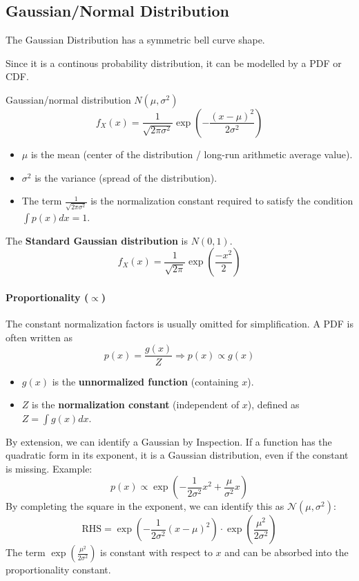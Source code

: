 \documentclass[../Probability.tex]{subfiles}
\begin{document}
\subsection{Gaussian/Normal Distribution}
The Gaussian Distribution has a symmetric bell curve shape.

\noindent Since it is a continous probability distribution, it can be modelled by a PDF or CDF.

\noindent Gaussian/normal distribution $N(\mu,\sigma^2)$
\[ f_X(x) = \frac{1}{\sqrt{2\pi\sigma^2}} \exp(-\frac{(x-\mu)^2}{2\sigma^2}) \]

\begin{itemize}
    \item $\mu$ is the mean (center of the distribution / long-run arithmetic average value).
    \item $\sigma^2$ is the variance (spread of the distribution).
    \item The term $\frac{1}{\sqrt{2\pi\sigma^2}}$ is the normalization constant required to satisfy the condition $\int p(x)dx = 1$.
\end{itemize}

\noindent The \textbf{Standard Gaussian distribution} is $N(0,1)$.
\[f_{X}(x)=\frac{1}{\sqrt{2\pi}}\exp(\frac{-x^2}{2})\]

\paragraph{Proportionality ($\propto$)}
The constant normalization factors is usually omitted for simplification. A PDF is often written as
\[
p(x) = \frac{g(x)}{Z} \Rightarrow p(x) \propto g(x)
\]
\begin{itemize}
    \item $g(x)$ is the \textbf{unnormalized function} (containing $x$).
    \item $Z$ is the \textbf{normalization constant} (independent of $x$), defined as $Z = \int g(x)dx$.
\end{itemize}

\noindent By extension, we can identify a Gaussian by Inspection.
If a function has the quadratic form in its exponent, it is a Gaussian distribution, even if the constant is missing. \newline
Example:
\[
p(x) \propto \exp\left( -\frac{1}{2\sigma^2}x^2 + \frac{\mu}{\sigma^2}x \right)
\]
By completing the square in the exponent, we can identify this as $\mathcal{N}(\mu, \sigma^2)$:
\[
\text{RHS} = \exp\left( -\frac{1}{2\sigma^2}(x - \mu)^2 \right) \cdot \exp\left( \frac{\mu^2}{2\sigma^2} \right)
\]
The term $\exp\left( \frac{\mu^2}{2\sigma^2} \right)$ is constant with respect to $x$ and can be absorbed into the proportionality constant.
\end{document}
